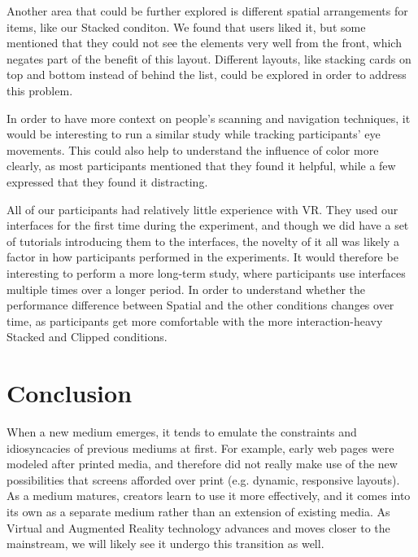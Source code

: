 \documentclass[nobib]{tufte-book} %
\begin{document}
Another area that could be further explored is different spatial arrangements for items, like our Stacked conditon. We found that users liked it, but some mentioned that they could not see the elements very well from the front, which negates part of the benefit of this layout. Different layouts, like stacking cards on top and bottom instead of behind the list, could be explored in order to address this problem.

In order to have more context on people's scanning and navigation techniques, it would be interesting to run a similar study while tracking participants' eye movements. This could also help to understand the influence of color more clearly, as most participants mentioned that they found it helpful, while a few expressed that they found it distracting.

All of our participants had relatively little experience with VR. They used our interfaces for the first time during the experiment, and though we did have a set of tutorials introducing them to the interfaces, the novelty of it all was likely a factor in how participants performed in the experiments. It would therefore be interesting to perform a more long-term study, where participants use interfaces multiple times over a longer period. In order to understand whether the performance difference between Spatial and the other conditions changes over time, as participants get more comfortable with the more interaction-heavy Stacked and Clipped conditions.



\chapter{Conclusion}
\label{ch:conclusion}

When a new medium emerges, it tends to emulate the constraints and idiosyncacies of previous mediums at first. For example, early web pages were modeled after printed media, and therefore did not really make use of the new possibilities that screens afforded over print (e.g. dynamic, responsive layouts). As a medium matures, creators learn to use it more effectively, and it comes into its own as a separate medium rather than an extension of existing media. As Virtual and Augmented Reality technology advances and moves closer to the mainstream, we will likely see it undergo this transition as well.
\end{document}
